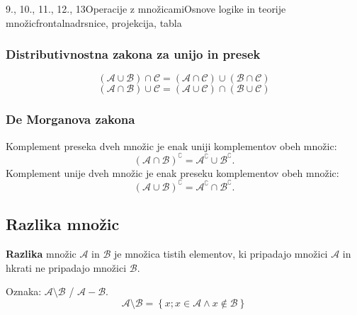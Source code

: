 \begin{priprava}{9., 10., 11., 12., 13}{}{Operacije z množicami}{Osnove logike in teorije množic}{frontalna}{drsnice, projekcija, tabla}
            \subsubsection{Distributivnostna zakona za unijo in presek}
    $$ \left(\mathcal{A}\cup\mathcal{B}\right)\cap\mathcal{C}=\left(\mathcal{A}\cap\mathcal{C}\right)\cup\left(\mathcal{B}\cap\mathcal{C}\right) $$
    $$ \left(\mathcal{A}\cap\mathcal{B}\right)\cup\mathcal{C}=\left(\mathcal{A}\cup\mathcal{C}\right)\cap\left(\mathcal{B}\cup\mathcal{C}\right) $$


    \subsubsection{De Morganova zakona}
    Komplement preseka dveh množic je enak uniji komplementov obeh množic:
    $$\left(\mathcal{A}\cap\mathcal{B}\right)^\complement=\mathcal{A}^\complement\cup\mathcal{B}^\complement. $$
    Komplement unije dveh množic je enak preseku komplementov obeh množic:
    $$\left(\mathcal{A}\cup\mathcal{B}\right)^\complement=\mathcal{A}^\complement\cap\mathcal{B}^\complement. $$







        \subsection{Razlika množic}
            \textbf{Razlika} množic $\mathcal{A}$ in $\mathcal{B}$ je množica tistih elementov, ki  
            pripadajo množici $\mathcal{A}$ in hkrati ne pripadajo množici $\mathcal{B}$.

            Oznaka: $\mathbf{\mathcal{A}\setminus\mathcal{B}}$ / $\mathbf{\mathcal{A}-\mathcal{B}}$.
            $$ \mathcal{A}\setminus\mathcal{B}=\left\{x; x\in\mathcal{A}\land x\notin\mathcal{B}\right\} $$
        

        
        


            \begin{figure}[H]
                \centering
                \begin{subfigure}[b]{0.4\textwidth}
                    \centering
\end{subfigure}
\end{figure}
\end{priprava}
